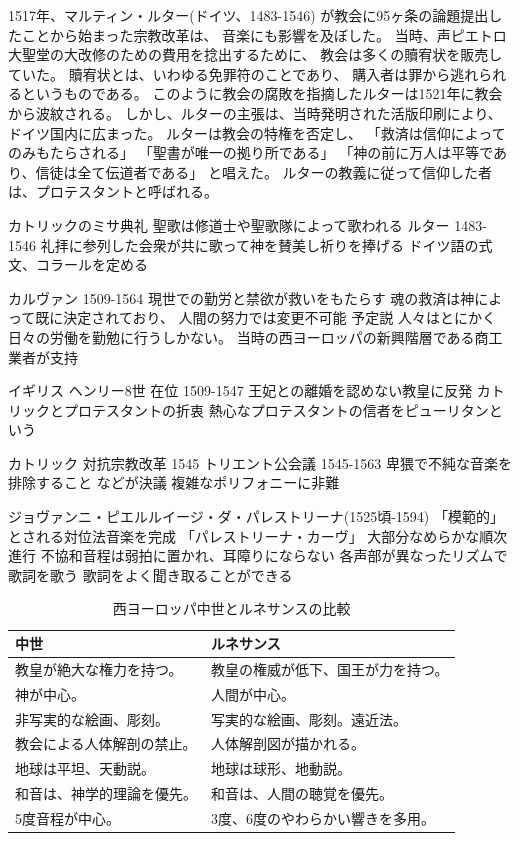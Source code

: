 \documentclass[a4j]{jarticle}
\begin{document}
1517年、マルティン・ルター(ドイツ、1483-1546)
が教会に95ヶ条の論題提出したことから始まった宗教改革は、
音楽にも影響を及ぼした。
当時、声ピエトロ大聖堂の大改修のための費用を捻出するために、
教会は多くの贖宥状を販売していた。
贖宥状とは、いわゆる免罪符のことであり、
購入者は罪から逃れられるというものである。
このように教会の腐敗を指摘したルターは1521年に教会から波紋される。
しかし、ルターの主張は、当時発明された活版印刷により、
ドイツ国内に広まった。
ルターは教会の特権を否定し、
「救済は信仰によってのみもたらされる」
「聖書が唯一の拠り所である」
「神の前に万人は平等であり、信徒は全て伝道者である」
と唱えた。
ルターの教義に従って信仰した者は、プロテスタントと呼ばれる。

カトリックのミサ典礼
聖歌は修道士や聖歌隊によって歌われる
ルター 1483-1546
礼拝に参列した会衆が共に歌って神を賛美し祈りを捧げる
ドイツ語の式文、コラールを定める

カルヴァン 1509-1564
現世での勤労と禁欲が救いをもたらす
魂の救済は神によって既に決定されており、
人間の努力では変更不可能
予定説
人々はとにかく日々の労働を勤勉に行うしかない。
当時の西ヨーロッパの新興階層である商工業者が支持

イギリス
ヘンリー8世 在位 1509-1547
王妃との離婚を認めない教皇に反発
カトリックとプロテスタントの折衷
熱心なプロテスタントの信者をピューリタンという

カトリック
対抗宗教改革
1545
トリエント公会議 1545-1563
卑猥で不純な音楽を排除すること
などが決議
複雑なポリフォニーに非難

ジョヴァンニ・ピエルルイージ・ダ・パレストリーナ(1525頃-1594)
「模範的」とされる対位法音楽を完成
「パレストリーナ・カーヴ」
大部分なめらかな順次進行
不協和音程は弱拍に置かれ、耳障りにならない
各声部が異なったリズムで歌詞を歌う
歌詞をよく聞き取ることができる


\begin{table}[tb]
 \begin{center}
  \caption{西ヨーロッパ中世とルネサンスの比較}
  \label{tab:comparison}
  \begin{tabular}{|l|l|} \hline
  中世                       & ルネサンス                         \\
  \hline \hline
  教皇が絶大な権力を持つ。   & 教皇の権威が低下、国王が力を持つ。 \\ \hline
  神が中心。                 & 人間が中心。                       \\ \hline
  非写実的な絵画、彫刻。     & 写実的な絵画、彫刻。遠近法。       \\ \hline
  教会による人体解剖の禁止。 & 人体解剖図が描かれる。             \\ \hline
  地球は平坦、天動説。       & 地球は球形、地動説。               \\ \hline
  和音は、神学的理論を優先。 & 和音は、人間の聴覚を優先。         \\
  5度音程が中心。            & 3度、6度のやわらかい響きを多用。   \\ \hline
  \end{tabular}
 \end{center}
\end{table}
\end{document}
